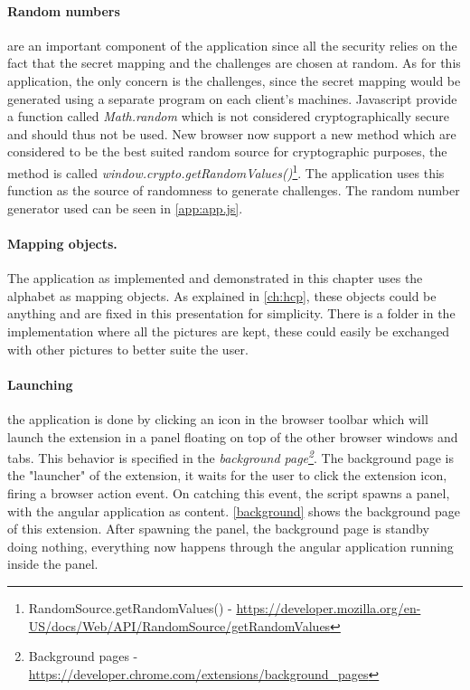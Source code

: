 \paragraph{Random numbers} are an important component of the application since all the security relies on the fact that the secret mapping and the challenges are chosen at random. As for this application, the only concern is the challenges, since the secret mapping would be generated using a separate program on each client's machines. Javascript provide a function called \emph{Math.random} which is not considered cryptographically secure~\cite{js-crypto} and should thus not be used. New browser now support a new method which are considered to be the best suited random source for cryptographic purposes, the method is called \emph{window.crypto.getRandomValues()}\footnote{RandomSource.getRandomValues() - \url{https://developer.mozilla.org/en-US/docs/Web/API/RandomSource/getRandomValues}}. The application uses this function as the source of randomness to generate challenges. The random number generator used can be seen in \autoref{app:app.js}.

\paragraph{Mapping objects.} The application as implemented and demonstrated in this chapter uses the alphabet as mapping objects. As explained in \autoref{ch:hcp}, these objects could be anything and are fixed in this presentation for simplicity. There is a folder in the implementation where all the pictures are kept, these could easily be exchanged with other pictures to better suite the user. 

\paragraph{Launching} the application is done by clicking an icon in the browser toolbar which will launch the extension in a panel floating on top of the other browser windows and tabs. This behavior is specified in the \emph{background page\footnote{Background pages - \url{https://developer.chrome.com/extensions/background_pages}}}. The background page is the "launcher" of the extension, it waits for the user to click the extension icon, firing a browser action event. On catching this event, the script spawns a panel, with the angular application as content. \autoref{background} shows the background page of this extension. After spawning the panel, the background page is standby doing nothing, everything now happens through the angular application running inside the panel. 

